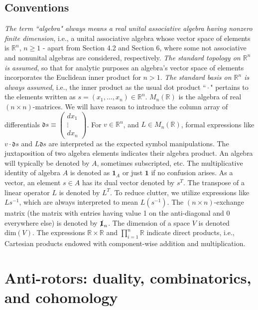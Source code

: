 \documentclass{amsart}
\numberwithin{equation}{section}
\theoremstyle{definition}
\numberwithin{theorem}{section}
\begin{document}
 \subsection{Conventions}  
 {\em The term {\rm ``algebra"} always means a real unital associative algebra having nonzero finite dimension}, i.e., a unital associative algebra whose vector space of elements is $\mathbb{R}^n$, $n\ge 1$ - apart from Section 4.2 and Section 6, where some not associative and nonunital algebras are considered, respectively.  {\it The standard topology on $\mathbb{R}^n$ is assumed}, so that for analytic purposes an algebra's vector space of elements incorporates the Euclidean inner product for $n>1$.  {\it The standard basis on $\mathbb{R}^n$ is always assumed}, i.e., the inner product as the usual dot product ``\,$\cdot$\," pertains to the elements written as $s=(x_1,\dots,x_n)\in\mathbb{R}^n$.  $M_n(\mathbb{R})$ is the algebra of real $(n\times n)$-matrices.  We will have reason to introduce the column array of differentials $\mathfrak{d}s \equiv \left(\begin{array}{ccc}
dx_1   \\ 
\vdots \\
dx_n   
\end{array}\right)$.  For $v\in\mathbb{R}^n$, and $L\in M_n(\mathbb{R})$, formal expressions like $v\cdot \mathfrak{d}s$ and $L\mathfrak{d}s$ are interpreted as the expected symbol manipulations.   The juxtaposition of two algebra elements indicates their algebra product.  An algebra will typically be denoted by $A$, sometimes subscripted, etc. The multiplicative identity of algebra $A$ is denoted as $\mathbf{1}_A$ or just $\mathbf{1}$ if no confusion arises.   As a vector, an element $s\in A$ has its dual vector denoted by $s^T$. The transpose of a linear operator $L$ is denoted by $L^T$.  To reduce clutter, we utilize expressions like $Ls^{-1}$, which are always interpreted to mean $L(s^{-1})$. \enlargethispage{1cm} The $(n\times n)$-exchange matrix (the matrix with entries having value 1 on the anti-diagonal and 0 everywhere else) is denoted by  $\slashed{\bf 1}_n$.  The dimension of a space $V$ is denoted $\text{dim}(V)$.  The expressions $\mathbb{R}\times \mathbb{R}$ and $\prod_{i=1}^n \mathbb{R}$ indicate \mbox{direct} products, i.e., Cartesian products endowed with component-wise addition and multiplication.
 


 \section{Anti-rotors: duality, combinatorics, and cohomology} 
\end{document}
